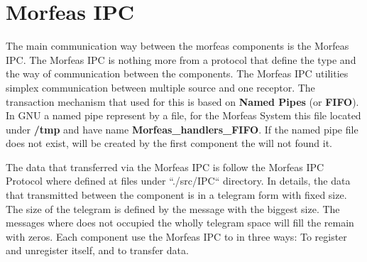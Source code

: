 \section{Morfeas IPC}
The main communication way between the morfeas components is the Morfeas IPC. The Morfeas IPC is nothing more from a protocol that define the type and
the way of communication between the components. The Morfeas IPC utilities simplex communication between multiple source and one receptor.
The transaction mechanism that used for this is based on \textbf{Named Pipes} (or \textbf{FIFO}). In GNU a named pipe represent by a file,
for the Morfeas System this file located under \textbf{/tmp} and have name \textbf{Morfeas\_handlers\_FIFO}.
If the named pipe file does not exist, will be created by the first component the will not found it.

The data that transferred via the Morfeas IPC is follow the Morfeas IPC Protocol where defined at files under ``./src/IPC`` directory.
In details, the data that transmitted between the component is in a telegram form with fixed size.
The size of the telegram is defined by the message with the biggest size. The messages where does not occupied the wholly telegram space will fill the remain with zeros.
Each component use the Morfeas IPC to in three ways: To register and unregister itself, and to transfer data.
